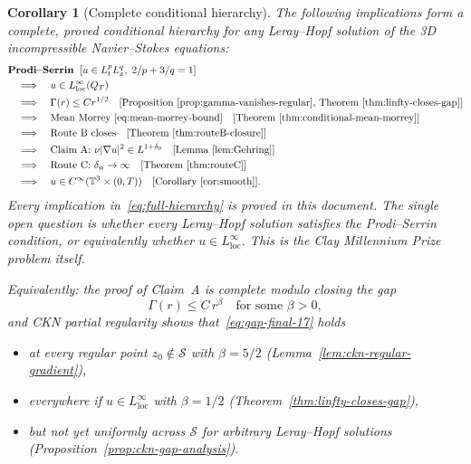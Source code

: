 \documentclass[11pt]{article}
\newtheorem{corollary}[theorem]{Corollary}
\theoremstyle{definition}
\theoremstyle{remark}
\newcommand{\T}{\mathbb{T}}
\newcommand{\grad}{\nabla}
\begin{document}
\begin{corollary}[Complete conditional hierarchy]
\label{cor:complete-hierarchy}
The following implications form a complete, proved conditional hierarchy
for any Leray--Hopf solution of the 3D incompressible Navier--Stokes equations:
\begin{equation}\label{eq:full-hierarchy}
\begin{aligned}
  &\textbf{Prodi--Serrin}\;\;[u\in L^p_t L^q_x,\;2/p+3/q=1] \\
  &\quad\Longrightarrow\quad
    u\in L^\infty_{\mathrm{loc}}(Q_T) \\
  &\quad\Longrightarrow\quad
    \Gamma(r)\leq C r^{1/2}
    \quad[\text{Proposition~\ref{prop:gamma-vanishes-regular},
    Theorem~\ref{thm:linfty-closes-gap}}] \\
  &\quad\Longrightarrow\quad
    \text{Mean Morrey}~\eqref{eq:mean-morrey-bound}
    \quad[\text{Theorem~\ref{thm:conditional-mean-morrey}}] \\
  &\quad\Longrightarrow\quad
    \text{Route~B closes}
    \quad[\text{Theorem~\ref{thm:routeB-closure}}] \\
  &\quad\Longrightarrow\quad
    \text{Claim~A: }\nu|\grad u|^2\in L^{1+\delta_0}
    \quad[\text{Lemma~\ref{lem:Gehring}}] \\
  &\quad\Longrightarrow\quad
    \text{Route~C: } \delta_n\to\infty
    \quad[\text{Theorem~\ref{thm:routeC}}] \\
  &\quad\Longrightarrow\quad
    u\in C^\infty(\T^3\times(0,T))
    \quad[\text{Corollary~\ref{cor:smooth}}].
\end{aligned}
\end{equation}
Every implication in~\eqref{eq:full-hierarchy} is proved in this document.
The single open question is whether every Leray--Hopf solution satisfies
the Prodi--Serrin condition, or equivalently whether $u\in L^\infty_{\mathrm{loc}}$.
This is the Clay Millennium Prize problem itself.

Equivalently: the proof of Claim~A is complete modulo closing the gap
\begin{equation}\label{eq:gap-final-17}
  \Gamma(r) \leq C\,r^\beta \quad \text{for some } \beta > 0,
\end{equation}
and CKN partial regularity shows that~\eqref{eq:gap-final-17} holds
\begin{itemize}
  \item at every regular point $z_0 \notin \mathcal{S}$ with $\beta = 5/2$
    (Lemma~\ref{lem:ckn-regular-gradient}),
  \item everywhere if $u \in L^\infty_{\mathrm{loc}}$ with $\beta = 1/2$
    (Theorem~\ref{thm:linfty-closes-gap}),
  \item but not yet uniformly across $\mathcal{S}$ for arbitrary Leray--Hopf
    solutions (Proposition~\ref{prop:ckn-gap-analysis}).
\end{itemize}
\end{corollary}
\end{document}
